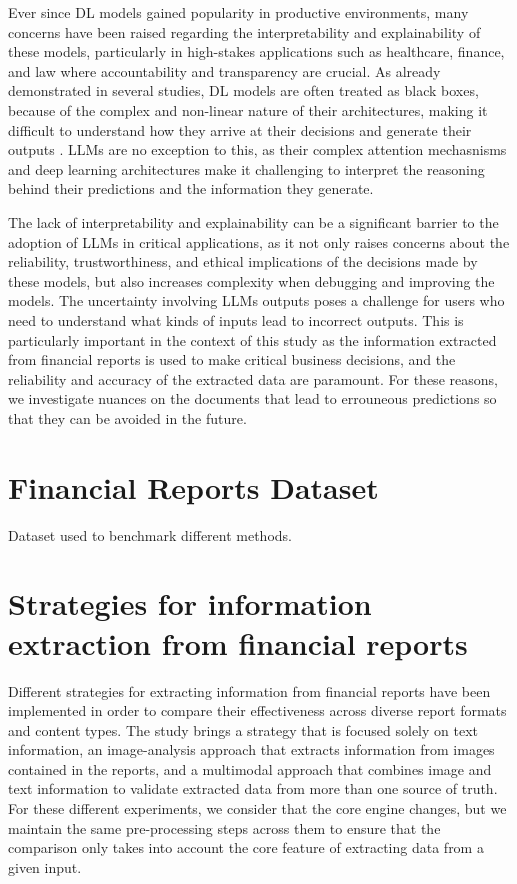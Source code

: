 \documentclass[english, 12pt, a4paper, elec, utf8, a-2b, online]{aaltothesis}
\begin{document}
Ever since \ac{DL} models gained popularity in productive environments, many concerns have been raised regarding the interpretability and explainability of these models, particularly in high-stakes applications such as healthcare, finance, and law where accountability and transparency are crucial.
As already demonstrated in several studies, \ac{DL} models are often treated as black boxes, because of the complex and non-linear nature of their architectures, making it difficult to understand how they arrive at their decisions and generate their outputs \cite{castelvecchi2016can, 2018_survey_explaining_black_box}.
\ac{LLM}s are no exception to this, as their complex attention mechasnisms and deep learning architectures make it challenging to interpret the reasoning behind their predictions and the information they generate.

The lack of interpretability and explainability can be a significant barrier to the adoption of \ac{LLM}s in critical applications, as it not only raises concerns about the reliability, trustworthiness, and ethical implications of the decisions made by these models, but also increases complexity when debugging and improving the models.
The uncertainty involving \ac{LLM}s outputs poses a challenge for users who need to understand what kinds of inputs lead to incorrect outputs.
This is particularly important in the context of this study as the information extracted from financial reports is used to make critical business decisions, and the reliability and accuracy of the extracted data are paramount.
For these reasons, we investigate nuances on the documents that lead to errouneous predictions so that they can be avoided in the future.

\clearpage

\section{Financial Reports Dataset}

Dataset used to benchmark different methods.

\clearpage

\section{Strategies for information extraction from financial reports}

Different strategies for extracting information from financial reports have been implemented in order to compare their effectiveness across diverse report formats and content types.
The study brings a strategy that is focused solely on text information, an image-analysis approach that extracts information from images contained in the reports, and a multimodal approach that combines image and text information to validate extracted data from more than one source of truth.
For these different experiments, we consider that the core engine changes, but we maintain the same pre-processing steps across them to ensure that the comparison only takes into account the core feature of extracting data from a given input.
\end{document}
